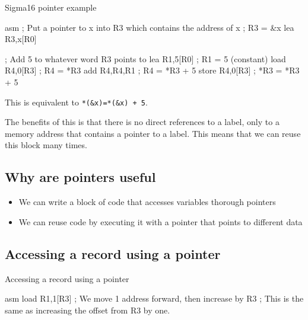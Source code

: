 \begin{highlight}{Sigma16 pointer example}
    \begin{code}{asm}
        ; Put a pointer to x into R3 which contains the address of x
        ; R3 = &x
        lea R3,x[R0]

        ; Add 5 to whatever word R3 points to
        lea R1,5[R0] ; R1 = 5 (constant)
        load R4,0[R3] ; R4 = *R3
        add R4,R4,R1 ; R4 = *R3 + 5
        store R4,0[R3] ; *R3 = *R3 + 5
    \end{code}
\end{highlight}
\begin{note}
    This is equivalent to \texttt{*(&x)=*(&x) + 5}.
\end{note}
The benefits of this is that there is no direct references to a label, only to a memory address that contains a pointer to a label.
This means that we can reuse this block many times.

\subsection{Why are pointers useful}\label{sub:why_are_pointers_useful}

\begin{itemize}
    \item We can write a block of code that accesses variables thorough pointers
    \item We can reuse code by executing it with a pointer that points to different data
\end{itemize}

\subsection{Accessing a record using a pointer}\label{sub:accessing_a_record_using_a_pointer}

\begin{highlight}{Accessing a record using a pointer}
    \begin{code}{asm}
        load R1,1[R3] ; We move 1 address forward, then increase by R3
        ; This is the same as increasing the offset from R3 by one.
    \end{code}
\end{highlight}

